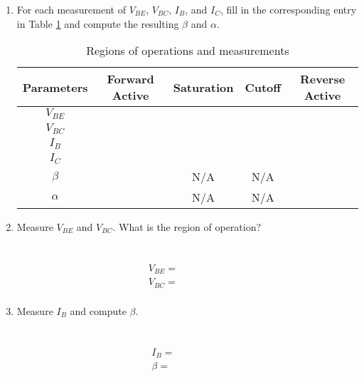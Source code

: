 \documentclass{article}
\begin{document}
\thispagestyle{plain}

\name

\begin{enumerate}
\item[3.1 \& 3.2] For each measurement of $V_{BE}$, $V_{BC}$, $I_B$, and $I_C$, fill in the corresponding entry in Table \ref{MeasurementTable} and compute the resulting $\beta$ and $\alpha$.
  
  \begin{table}[!htb]
    \begin{center}
      \begin{tabular}{|c|c|c|c|c|} \hline
	Parameters & Forward Active & Saturation & Cutoff & Reverse Active \\\hline \hline
	$V_{BE}$ & & & & \\ \hline
	$V_{BC}$ & & & & \\ \hline
	$I_B$ & & & & \\ \hline
	$I_C$ & & & & \\ \hline
	$\beta$ & & N/A & N/A & \\ \hline
	$\alpha$ & & N/A & N/A & \\ \hline
      \end{tabular}
      \caption{Regions of operations and measurements}
      \label{MeasurementTable}
    \end{center}
  \end{table}

\item[3.1.2] Measure $V_{BE}$ and $V_{BC}$. What is the region of operation?
  \\~\\~\\
  \begin{align*}
    \boxed{V_{BE} = ~~~~~~~~~~~~~~~~~~~~~~ } \\
    \boxed{V_{BC} = ~~~~~~~~~~~~~~~~~~~~~~ } \\
  \end{align*}
  
\item[3.1.3] Measure $I_B$ and compute $\beta$.
  \\~\\~\\
  \begin{align*}
    \boxed{I_B   = ~~~~~~~~~~~~~~~~~~~~~~ } \\
    \boxed{\beta = ~~~~~~~~~~~~~~~~~~~~~~ } \\
  \end{align*}


\end{enumerate}
\end{document}
